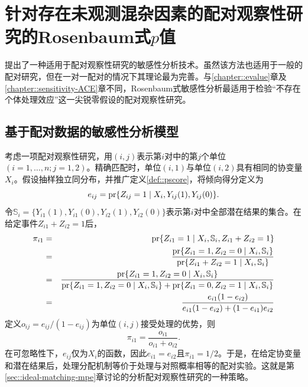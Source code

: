 
\chapter{针对存在未观测混杂因素的配对观察性研究的Rosenbaum式$p$值}
\label{sec::rosenbaum-sensitivity-analysis}


\citet{rosenbaum1987sensitivity}提出了一种适用于配对观察性研究的敏感性分析技术。虽然该方法也适用于一般的配对研究\citep{rosenbaum2002design}，但在一对一配对的情况下其理论最为完善。与\ref{chapter::evalue}章及\ref{chapter::sensitivity-ACE}章不同，Rosenbaum式敏感性分析最适用于检验“不存在个体处理效应”这一尖锐零假设的配对观察性研究。


\section{基于配对数据的敏感性分析模型}


考虑一项配对观察性研究，用$(i,j)$表示第$i$对中的第$j$个单位$(i=1,\ldots, n; j=1,2)$。精确匹配时，单位$(i, 1)$与单位$(i, 2)$具有相同的协变量$X_i$。假设抽样独立同分布，并推广定义\ref{def::pscore}，将倾向得分定义为
$$
e_{ij} = \textup{pr}\{  Z_{ij} = 1\mid X_i, Y_{ij}(1), Y_{ij}(0) \} .
$$
令$\mathbb{S}_i = \{Y_{i1}(1), Y_{i1}(0), Y_{i2}(1), Y_{i2}(0)\}$表示第$i$对中全部潜在结果的集合。在给定事件$Z_{i1} + Z_{i2} = 1$后，
\begin{eqnarray*}
\pi_{i1} &=& \textup{pr}\{ Z_{i1} = 1 \mid X_i, \mathbb{S}_i, Z_{i1} + Z_{i2} = 1 \} \\
&=& \frac{ \textup{pr}\{ Z_{i1} = 1, Z_{i2} = 0  \mid X_i, \mathbb{S}_i \} }
{ \textup{pr}\{ Z_{i1} + Z_{i2} = 1 \mid X_i, \mathbb{S}_i \} } \\
&=& \frac{ \textup{pr}\{ Z_{i1} = 1, Z_{i2} = 0  \mid X_i, \mathbb{S}_i \} }{ 
\textup{pr}\{ Z_{i1} = 1, Z_{i2} = 0 \mid X_i, \mathbb{S}_i \} + \textup{pr}\{ Z_{i1} = 0, Z_{i2} = 1 \mid X_i, \mathbb{S}_i \}
}\\
&=& \frac{  e_{i1} (1-e_{i2}) }{ e_{i1} (1-e_{i2}) + (1-e_{i1}) e_{i2}} 
\end{eqnarray*}
定义$o_{ij} = e_{ij} / (1 - e_{ij})$为单位$(i,j)$接受处理的优势，则
$$
\pi_{i1}  = \frac{o_{i1}}{  o_{i1} + o_{i2} } . 
$$
在可忽略性下，$e_{ij}$仅为$X_i$的函数，因此$e_{i1} = e_{i2}$且$\pi_{i1} = 1/2 $。于是，在给定协变量和潜在结果后，处理分配机制等价于处理与对照概率相等的配对实验。这就是第\ref{sec::ideal-matching-mpe}章讨论的分析配对观察性研究的一种策略。 


